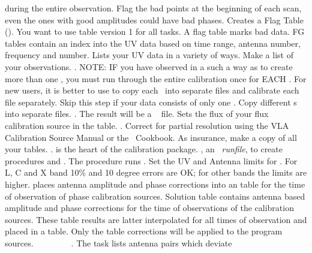 during the entire observation.
 Flag the bad points at the beginning of each
scan, even the ones with good amplitudes could have bad phases.
Creates a Flag Table ().  You want to use
 table version 1 for all tasks.
\tablestyle
\beddes
{} A flag table marks bad data. FG tables contain
an index into the UV data based
on time range, antenna number, frequency and \IF number.
\eeddes
\normalstyle
{} Lists your UV data in a variety of ways.  Make a list
of your observations.
.
NOTE: IF you have observed in a such a way as to create more than one
\FREQID,  you must run through the entire calibration
once for EACH \FREQID.
For new users, it is better to use  to copy each
\FREQID\ into separate files and calibrate each file separately.
 Skip this step if your data consists of only one \FREQID.
Copy different \FREQID s into separate files.
.
The result will be a ~ file.
 Sets the flux of your flux calibration source in the \SU
table.
.
Correct for partial resolution using the VLA Calibration Source
Manual or the \AIPS\ Cookbook.
 As insurance, make a copy of all your tables.
.
  is the heart of the \AIPS
calibration package.
, an \AIPS\ {\it runfile}, to create
procedures  and .
The procedure  runs .
Set the UV and Antenna limits for .
For L, C and X band 10\% and 10 degree errors are OK;
for other bands the limits are higher.
 places antenna amplitude and phase corrections into
an \SN table for the
time of observation of phase calibration sources.
\tablestyle
\beddes
{} Solution table contains antenna based amplitude
and phase corrections for the time of observations of the calibration
sources.
These \SN table results are latter interpolated for all times
of observation and placed in a \CL table.
Only the \CL table corrections will be applied to the program sources.
\eeddes
\normalstyle
{}~ ~
~ ~
~
.
The task  lists antenna pairs which deviate
